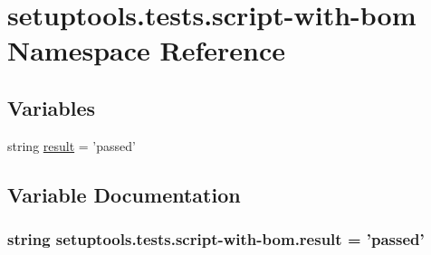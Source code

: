 \hypertarget{namespacesetuptools_1_1tests_1_1script-with-bom}{}\section{setuptools.\+tests.\+script-\/with-\/bom Namespace Reference}
\label{namespacesetuptools_1_1tests_1_1script-with-bom}
\subsection*{Variables}
\begin{DoxyCompactItemize}
\item 
string \hyperlink{namespacesetuptools_1_1tests_1_1script-with-bom_aedbbee7b08f71658715a57fda5833f10}{result} = 'passed'
\end{DoxyCompactItemize}


\subsection{Variable Documentation}
\hypertarget{namespacesetuptools_1_1tests_1_1script-with-bom_aedbbee7b08f71658715a57fda5833f10}{}
\subsubsection[{result}]{\setlength{\rightskip}{0pt plus 5cm}string setuptools.\+tests.\+script-\/with-\/bom.\+result = 'passed'}\label{namespacesetuptools_1_1tests_1_1script-with-bom_aedbbee7b08f71658715a57fda5833f10}
